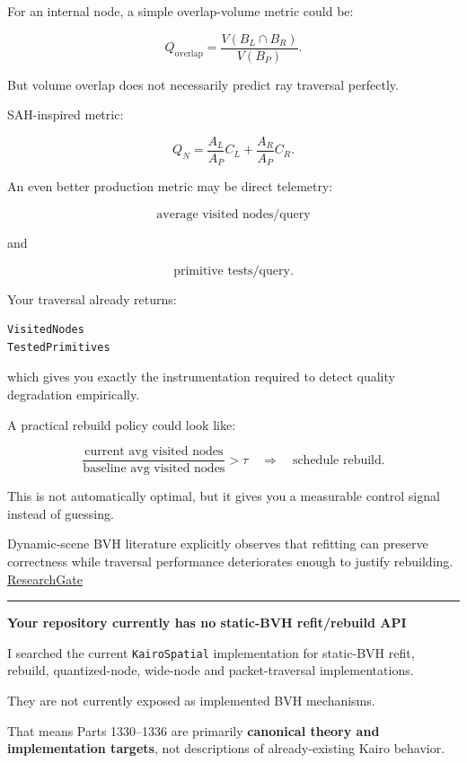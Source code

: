 For an internal node, a simple overlap-volume metric could be:

\[
Q_{\text{overlap}}
=
\frac{
V(B_L\cap B_R)
}{
V(B_P)
}.
\]

But volume overlap does not necessarily predict ray traversal perfectly.

SAH-inspired metric:

\[
Q_N
=
\frac{A_L}{A_P}C_L
+
\frac{A_R}{A_P}C_R.
\]

An even better production metric may be direct telemetry:

\[
\text{average visited nodes/query}
\]

and

\[
\text{primitive tests/query}.
\]

Your traversal already returns:

\begin{verbatim}
VisitedNodes
TestedPrimitives
\end{verbatim}

which gives you exactly the instrumentation required to detect quality degradation empirically.

A practical rebuild policy could look like:

\[
\frac{
\text{current avg visited nodes}
}{
\text{baseline avg visited nodes}
}
>\tau
\quad\Rightarrow\quad
\text{schedule rebuild}.
\]

This is not automatically optimal, but it gives you a measurable control signal instead of guessing.

Dynamic-scene BVH literature explicitly observes that refitting can preserve correctness while traversal performance deteriorates enough to justify rebuilding. \href{https://www.researchgate.net/publication/234777055_Special_Section_Parallel_Graphics_and_Visualization_Fast_parallel_and_asynchronous_construction_of_BVHs_for_ray_tracing_animated_scenes?utm_source=chatgpt.com}{ResearchGate}

\begin{center}\rule{0.5\linewidth}{0.5pt}\end{center}

\textbf{Your repository currently has no static-BVH refit/rebuild API}

I searched the current \texttt{KairoSpatial} implementation for static-BVH refit, rebuild, quantized-node, wide-node and packet-traversal implementations.

They are not currently exposed as implemented BVH mechanisms.

That means Parts 1330--1336 are primarily \textbf{canonical theory and implementation targets}, not descriptions of already-existing Kairo behavior.

